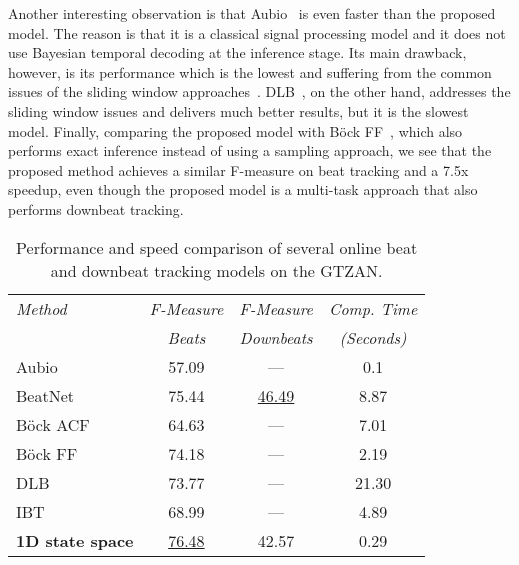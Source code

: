 \documentclass{article}
\begin{document}
Another interesting observation is that Aubio~\cite{Brossier} is even faster than the proposed model. The reason is that it is a classical signal processing model and it does not use Bayesian temporal decoding at the inference stage. Its main drawback, however, is its performance which is the lowest and suffering from the common issues of the sliding window approaches~\cite{Oliveria}. DLB~\cite{Heydari}, on the other hand, addresses the sliding window issues and delivers much better results, but it is the slowest model.  
Finally, comparing the proposed model with Böck FF~\cite{Bock:3,Bock:4}, which also performs exact inference instead of using a sampling approach,
we see that the proposed method achieves a similar F-measure on beat tracking and a 7.5x speedup, even though the proposed model is a multi-task approach that also performs downbeat tracking. 

\begin{table}[t]
  \begin{center}
      \caption{Performance and speed comparison of several online beat and downbeat tracking models on the GTZAN.\\}
    \begin{tabular}{lccc}
        \hline
        \small\textit{Method} & \small\textit{F-Measure} & \small\textit{F-Measure} & \small\textit{Comp. Time} \\
         & \small\textit{Beats} & \small\textit{Downbeats}   &\small\textit{(Seconds)} \\
\hline
\small Aubio \cite{Brossier} & \small 57.09 & \small --- & \small 0.1 \\
\small BeatNet \cite{Heydari:2} & \small \small{75.44} & \small \underline{46.49} & \small 8.87\\
\small Böck ACF \cite{Bock:2} & \small 64.63 & \small --- & \small 7.01\\
\small Böck FF \cite{Bock:3} & \small 74.18 & \small --- & \small 2.19\\
\small DLB \cite{Heydari} & \small 73.77 & \small --- & \small 21.30\\
\small IBT \cite{Oliveria} & \small 68.99 & \small --- & \small 4.89\\
\small \textbf{1D state space}  & \underline{76.48} & \small 42.57 & \small 0.29\\
        \hline
    \end{tabular}
\vspace{-0.2 in}
    \label{tab:results}
  \end{center}
\end{table}
\end{document}

